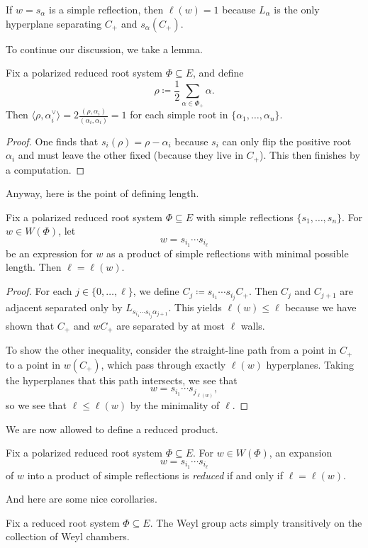 \documentclass[../notes.tex]{subfiles}
\begin{document}
\begin{example}
	If $w=s_\alpha$ is a simple reflection, then $\ell(w)=1$ because $L_{\alpha}$ is the only hyperplane separating $C_+$ and $s_\alpha(C_+)$.
\end{example}
To continue our discussion, we take a lemma.
\begin{lemma}
	Fix a polarized reduced root system $\Phi\subseteq E$, and define
	\[\rho\coloneqq\frac12\sum_{\alpha\in\Phi_+}\alpha.\]
	Then $\langle\rho,\alpha_i^\lor\rangle=2\frac{(\rho,\alpha_i)}{(\alpha_i,\alpha_i)}=1$ for each simple root in $\{\alpha_1,\ldots,\alpha_n\}$.
\end{lemma}
\begin{proof}
	One finds that $s_i(\rho)=\rho-\alpha_i$ because $s_i$ can only flip the positive root $\alpha_i$ and must leave the other fixed (because they live in $C_+$). This then finishes by a computation.
\end{proof}
Anyway, here is the point of defining length.
\begin{theorem}
	Fix a polarized reduced root system $\Phi\subseteq E$ with simple reflections $\{s_1,\ldots,s_n\}$. For $w\in W(\Phi)$, let
	\[w=s_{i_1}\cdots s_{i_\ell}\]
	be an expression for $w$ as a product of simple reflections with minimal possible length. Then $\ell=\ell(w)$.
\end{theorem}
\begin{proof}
	For each $j\in\{0,\ldots,\ell\}$, we define $C_j\coloneq s_{i_1}\cdots s_{i_j}C_+$. Then $C_{j}$ and $C_{j+1}$ are adjacent separated only by $L_{s_{i_1}\cdots s_{i_j}\alpha_{j+1}}$. This yields $\ell(w)\le\ell$ because we have shown that $C_+$ and $wC_+$ are separated by at most $\ell$ walls.

	To show the other inequality, consider the straight-line path from a point in $C_+$ to a point in $w(C_+)$, which pass through exactly $\ell(w)$ hyperplanes. Taking the hyperplanes that this path intersects, we see that
	\[w={s_{i_1}}\cdots s_{j_{\ell(w)}},\]
	so we see that $\ell\le\ell(w)$ by the minimality of $\ell$.
\end{proof}
We are now allowed to define a reduced product.
\begin{definition}[reduced]
	Fix a polarized reduced root system $\Phi\subseteq E$. For $w\in W(\Phi)$, an expansion
	\[w=s_{i_1}\cdots s_{i_\ell}\]
	of $w$ into a product of simple reflections is \textit{reduced} if and only if $\ell=\ell(w)$.
\end{definition}
And here are some nice corollaries.
\begin{corollary}
	Fix a reduced root system $\Phi\subseteq E$. The Weyl group acts simply transitively on the collection of Weyl chambers.
\end{corollary}
\end{document}
